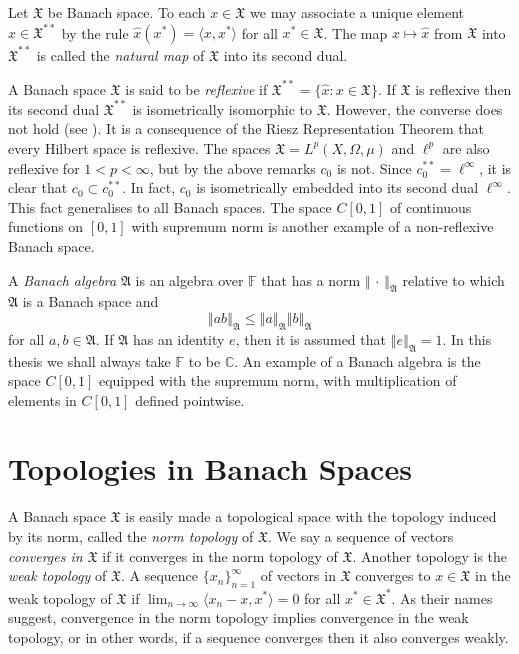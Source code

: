 \documentclass[12pt]{UNSWthesis}
\newcommand{\C}{\mathbb{C}}
\newcommand{\F}{\mathbb{F}}
\newcommand{\X}{\mathfrak{X}}
\newcommand{\hatt}[1]{\widehat #1}
\def\ip<#1,#2>{\langle #1,#2 \rangle}
\def\lp{\ell^p}
\def\norm#1{\left \Vert #1 \right \Vert}
\numberwithin{equation}{section}
\begin{document}
Let $\X$ be Banach space. To each $x\in\X$ we may associate a unique element
$\hatt{x}\in\X^{**}$ by the rule $\hatt{x}(x^*)=\ip<x,x^*>$ for all $x^*\in\X$.
The map $x\mapsto\hatt{x}$ from $\X$ into $\X^{**}$ is called the {\em natural
map} of $\X$ into its second dual.

A Banach space $\X$ is said to be {\em reflexive} if
$\X^{**}=\{\hatt{x}:x\in\X\}$. If $\X$ is reflexive then its second dual
$\X^{**}$ is isometrically isomorphic to $\X$. However, the converse does not
hold (see \cite[III.11]{Con}). It is a consequence of the Riesz Representation
Theorem \cite[I.3.4]{Con} that every Hilbert space is reflexive.
The spaces $\X=L^p(X,\Omega,\mu)$ and
$\lp$ are also reflexive for $1<p<\infty$, but by the above remarks $c_0$ is 
not. Since
$c_0^{**}=\ell^{\infty}$, it is clear that $c_0\subset c_0^{**}$. In fact,
$c_0$ is isometrically embedded into its second dual $\ell^{\infty}$. This fact
generalises to
all Banach spaces. The space $C[0,1]$ of continuous functions on $[0,1]$ with
supremum norm is another example of a non-reflexive Banach space.

A {\em Banach algebra} $\mathfrak{A}$ is an algebra over $\F$ that has a norm
$\norm{\,\cdot\,}_{\mathfrak{A}}$ relative to which $\mathfrak{A}$ is a Banach
space and
\[\norm{ab}_{\mathfrak{A}}\leq\norm{a}_{\mathfrak{A}}\norm{b}_{\mathfrak{A}}\]
for all $a,b\in\mathfrak{A}$. If $\mathfrak{A}$ has an identity $e$, then it is
assumed that $\norm{e}_{\mathfrak{A}}=1$. In this thesis we shall always take
$\F$ to be $\C$. An example of a Banach algebra is the space $C[0,1]$ equipped
with the supremum norm, with multiplication of elements in $C[0,1]$ defined
pointwise.


\section{Topologies in Banach Spaces}\label{topologies}

A Banach space $\X$ is easily made a topological space with the topology induced
by its norm, called the {\em norm topology} of $\X$. We say a sequence of
vectors {\em converges in $\X$} if it converges in the norm topology of $\X$.
Another
topology is the {\em weak topology} of $\X$. A sequence $\{x_n\}_{n=1}^{\infty}$
of vectors in $\X$ converges to $x\in\X$ in the weak topology of $\X$ if
$\lim_{n\rightarrow\infty}\ip<x_n-x,x^*>=0$ for all $x^*\in\X^*$. As their names
suggest, convergence in the norm topology implies convergence in the weak
topology, or in other words, if a sequence converges then it also converges
weakly.
\end{document}
